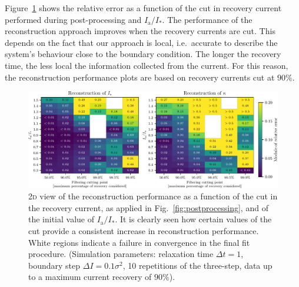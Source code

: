 Figure~\ref{fig:different_cut} shows the relative error as a function of the cut in recovery current performed during post-processing and $I_\mathrm{a}/I_\ast$. The performance of the reconstruction approach improves when the recovery currents are cut. This depends on the fact that our approach is local, i.e.\ accurate to describe the system's behaviour close to the boundary condition. The longer the recovery time, the less local the information collected from the current. For this reason, the reconstruction performance plots are based on recovery currents cut at $90\%$. 

\begin{figure}[t]
    \centering
    \includegraphics[width=\textwidth]{4_probing_the_diffusive_behavior/figs/final/MULTI_different_filter.pdf}
    \caption{2\textsc{d} view of the reconstruction performance as a function of the cut in the recovery current, as applied in Fig.~\ref{fig:postprocessing}, and of the initial value of $I_\mathrm{a}/I_\ast$. It is clearly seen how certain values of the cut provide a consistent increase in reconstruction performance. White regions indicate a failure in convergence in the final fit procedure. (Simulation parameters: relaxation time $\Delta t=1$, boundary step $\Delta I=0.1 \sigma^2$, 10 repetitions of the three-step, data up to a maximum current recovery of $90\%$).}
    \label{fig:different_cut}
\end{figure}

